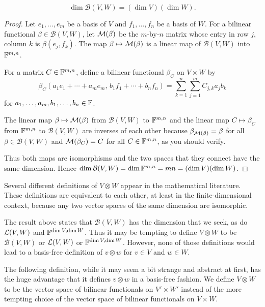 \begin{result}\label{ax:9.70}\leavevmode
\[ \dim\mathcal{B}(V,W)=(\dim V)(\dim W). \]
\end{result}

\begin{proof}
Let $e_1,\dots,e_m$ be a basis of $V$ and $f_1,\dots,f_n$ be a basis of $W$.
For a bilinear functional $\beta\in\mathcal{B}(V,W)$, let $\mathcal{M}(\beta)$ be the
$m$-by-$n$ matrix whose entry in row $j$, column $k$ is $\beta(e_j,f_k)$. The
map $\beta\mapsto\mathcal{M}(\beta)$ is a linear map of $\mathcal{B}(V,W)$ into
$\mathbb{F}^{m,n}$.

For a matrix $C\in\mathbb{F}^{m,n}$, define a bilinear functional $\beta_C$ on
$V\times W$ by
\[ \beta_C(a_1e_1+\cdots+a_me_m,\,b_1f_1+\cdots+b_nf_n)
   = \sum_{k=1}^n\sum_{j=1}^m C_{j,k}a_jb_k \]
for $a_1,\dots,a_m,b_1,\dots,b_n\in\mathbb{F}$.

The linear map $\beta\mapsto\mathcal{M}(\beta)$ from $\mathcal{B}(V,W)$ to $\mathbb{F}^{m,n}$
and the linear map $C\mapsto\beta_C$ from $\mathbb{F}^{m,n}$ to $\mathcal{B}(V,W)$ are
inverses of each other because $\beta_{\mathcal{M}(\beta)}=\beta$ for all
$\beta\in\mathcal{B}(V,W)$ and $\mathcal{M}(\beta_C)=C$ for all $C\in\mathbb{F}^{m,n}$, as you
should verify.

Thus both maps are isomorphisms and the two spaces that they connect have the
same dimension. Hence
$\operatorname{dim}\mathcal{B}(V,W)=\operatorname{dim}\mathbb{F}^{m,n}=mn=(\operatorname{dim} V)(\operatorname{dim} W)$.
\end{proof}

Several different definitions of $V\otimes W$ appear in the mathematical
literature. These definitions are equivalent to each other, at least in the
finite-dimensional context, because any two vector spaces of the same dimension
are isomorphic.

The result above states that $\mathcal{B}(V,W)$ has the dimension that we seek,
as do $\mathcal{L}(V,W)$ and $\mathbb{F}^{\operatorname{dim} V,\operatorname{dim} W}$. Thus it may be tempting to define
$V\otimes W$ to be $\mathcal{B}(V,W)$ or $\mathcal{L}(V,W)$ or $\mathbb{F}^{\operatorname{dim} V,\operatorname{dim} W}$.
However, none of those definitions would lead to a basis-free definition of
$v\otimes w$ for $v\in V$ and $w\in W$.

The following definition, while it may seem a bit strange and abstract at
first, has the huge advantage that it defines $v\otimes w$ in a basis-free
fashion. We define $V\otimes W$ to be the vector space of bilinear functionals
on $V'\times W'$ instead of the more tempting choice of the vector space of
bilinear functionals on $V\times W$.

